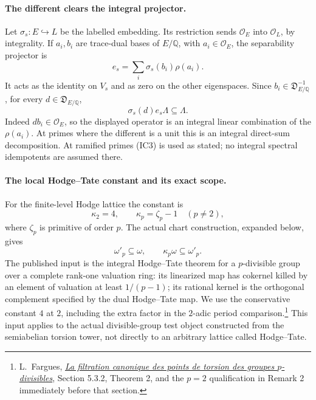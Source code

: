 \paragraph{The different clears the integral projector.}
Let \(\sigma_s:E\hookrightarrow L\) be the labelled
embedding. Its restriction sends
\(\mathcal O_E\) into \(\mathcal O_L\), by integrality.
If \(a_i,b_i\) are trace-dual bases of \(E/\mathbb Q\),
with \(a_i\in\mathcal O_E\), the separability projector is
\[
                e_s=\sum_i\sigma_s(b_i)\rho(a_i).
 \tag{IC2}
\]
It acts as the identity on \(V_s\) and as zero on the
other eigenspaces. Since
\(b_i\in\mathfrak D_{E/\mathbb Q}^{-1}\), for every
\(d\in\mathfrak D_{E/\mathbb Q}\),
\[
                    \sigma_s(d)e_s\Lambda\subseteq\Lambda .
 \tag{IC3}
\]
Indeed \(db_i\in\mathcal O_E\), so the displayed
operator is an integral linear combination of
the \(\rho(a_i)\).
At primes where the different is a unit this is
an integral direct-sum decomposition.
At ramified primes (IC3) is used as stated; no
integral spectral idempotents are assumed there.

\paragraph{The local Hodge--Tate constant and its exact scope.}
For the finite-level Hodge lattice the constant is
\[
        \kappa_2=4,\qquad
        \kappa_p=\zeta_p-1\quad(p\ne2),
 \tag{IC4}
\]
where \(\zeta_p\) is primitive of order \(p\).
The actual chart construction, expanded below, gives
\[
       \omega'_p\subseteq\omega,\qquad
                   \kappa_p\omega\subseteq\omega'_p .
 \tag{IC5}
\]
The published input is the integral Hodge--Tate theorem
for a \(p\)-divisible group over a complete rank-one
valuation ring: its linearized map has cokernel killed
by an element of valuation at least \(1/(p-1)\);
its rational kernel is the orthogonal complement
specified by the dual Hodge--Tate map.
We use the conservative constant \(4\) at \(2\),
including the extra factor in the \(2\)-adic period
comparison.\footnote{L.~Fargues,
\href{https://www.numdam.org/item/10.24033/asens.2157.pdf}
{\emph{La filtration canonique des points de torsion des
groupes \(p\)-divisibles}}, Section 5.3.2, Theorem 2,
and the \(p=2\) qualification in Remark 2 immediately
before that section.}
This input applies to the actual divisible-group
test object constructed from the semiabelian torsion
tower, not directly to an arbitrary lattice called
Hodge--Tate.

